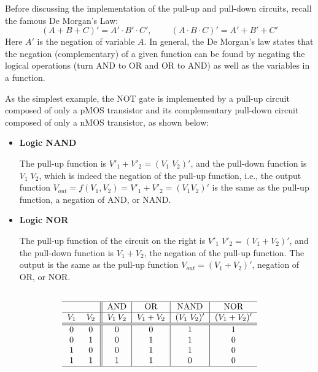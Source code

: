 Before discussing the implementation of the pull-up and pull-down circuits,
recall the famous De Morgan's Law:
\[ (A+B+C)'=A'\cdot B'\cdot C',\;\;\;\;\;\;\;\;(A\cdot B\cdot C)'=A'+B'+C' \]
Here $A'$ is the negation of variable $A$. In general, the De Morgan's law 
states that the negation (complementary) of a given function can be found 
by negating the logical operations (turn AND to OR and OR to AND) as well as 
the variables in a function. 

As the simplest example, the NOT gate is implemented by a pull-up circuit
composed of only a pMOS transistor and its complementary pull-down circuit
composed of only a nMOS transistor, as shown below:


\begin{itemize}
\item {\bf Logic NAND}

The pull-up function is $V'_1+V'_2=(V_1\;V_2)'$, and the pull-down function 
is $V_1\;V_2$, which is indeed the negation of the pull-up function, i.e., 
the output function $V_{out}=f(V_1,V_2)=V'_1+V'_2=(V_1 V_2)'$ is the same 
as the pull-up function, a negation of AND, or NAND.

\item {\bf Logic NOR}

The pull-up function of the circuit on the right is $V'_1\;V'_2=(V_1+V_2)'$,
and the pull-down function is $V_1+V_2$, the negation of the pull-up function.
The output is the same as the pull-up function $V_{out}=(V_1+V_2)'$, negation
of OR, or NOR.
\end{itemize}

\[ \begin{tabular}{cc||c|c|c|c} \\ \hline 
  &       &  AND & OR & NAND         &   NOR        \\ \hline
$V_1$ 	& $V_2$ & $V_1\,V_2$ & $V_1+V_2$ &  $(V_1\; V_2)'$ & $(V_1+V_2)'$ \\ \hline \hline
  0 	& 0 	& 0 & 0 & 1		 & 1            \\
  0 	& 1 	& 0 & 1 & 1		 & 0            \\
  1 	& 0 	& 0 & 1 & 1		 & 0            \\
  1 	& 1 	& 1 & 1 & 0		 & 0            \\ \hline
\end{tabular} \]


